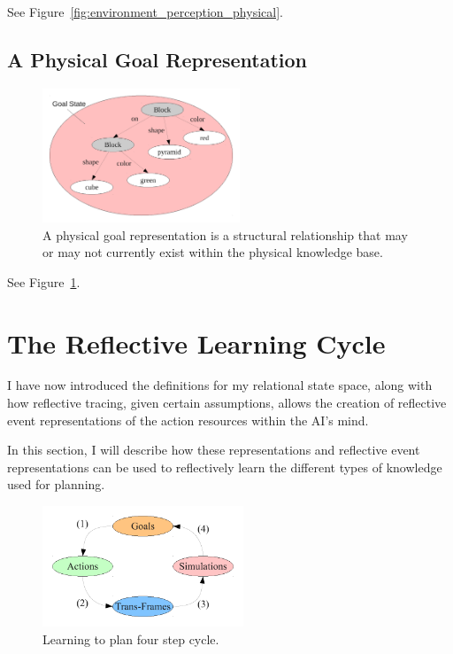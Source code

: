 See Figure~\ref{fig:environment_perception_physical}.


\subsection{A Physical Goal Representation}

\begin{figure}[bth]
  \center
  \includegraphics[height=4cm]{gfx/goal_state}
  \caption[A physical goal representation]{A physical goal
    representation is a structural relationship that may or may not
    currently exist within the physical knowledge base.}
  \label{fig:goal_state}
\end{figure}

See Figure~\ref{fig:goal_state}.


\section{The Reflective Learning Cycle}

I have now introduced the definitions for my relational state space,
along with how reflective tracing, given certain assumptions, allows
the creation of reflective event representations of the action
resources within the AI's mind.

In this section, I will describe how these representations and
reflective event representations can be used to reflectively learn the
different types of knowledge used for planning.

\begin{figure}[bth]
  \center
  \includegraphics[width=6cm]{gfx/learning_to_plan-four_step_cycle}
  \caption[Learning to plan four step cycle]{Learning to plan four step cycle.}
  \label{fig:learning_to_plan-four_step_cycle}
\end{figure}

